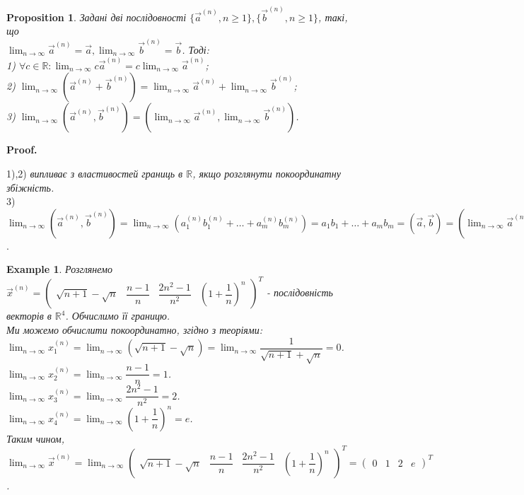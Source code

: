 \documentclass[a4paper, 10pt]{article}
\makeatletter
\def\huge{\displaystyle}
\def\qed{$\blacksquare$}
\theoremstyle{theoremdd}
\theoremstyle{theoremdd}
\theoremstyle{theoremdd}
\theoremstyle{theoremdd}
\theoremstyle{theoremdd}
\newtheorem{example}[theorem]{Example}
\theoremstyle{theoremdd}
\newtheorem{proposition}[theorem]{Proposition}
\theoremstyle{theoremdd}
\theoremstyle{theoremdd}
\theoremstyle{theoremdd}
\renewenvironment{proof}[1][Proof.\\]{\par
\pushQED{\hfill \qed}%
\normalfont \topsep6\p@\@plus6\p@\relax
\trivlist
\item\relax
{\bfseries
#1\@addpunct{.}}\hspace\labelsep\ignorespaces
}{%
\popQED\endtrivlist\@endpefalse
}
\makeatother
\begin{document}
\begin{proposition}
Задані дві послідовності $\{\vec{a}^{(n)}, n \geq 1\}, \{\vec{b}^{(n)}, n \geq 1\}$, такі, що \\ $\huge \lim_{n \to \infty} \vec{a}^{(n)} = \vec{a}, \lim_{n \to \infty} \vec{b}^{(n)} = \vec{b}$. Тоді:\\
1) $\forall c \in \mathbb{R}: \huge \lim_{n \to \infty} c \vec{a}^{(n)} = c \lim_{n \to \infty} \vec{a}^{(n)}$;\\
2) $\huge \lim_{n \to \infty} (\vec{a}^{(n)} + \vec{b}^{(n)}) = \lim_{n \to \infty} \vec{a}^{(n)} + \lim_{n \to \infty} \vec{b}^{(n)}$;\\
3) $\huge \lim_{n \to \infty} (\vec{a}^{(n)}, \vec{b}^{(n)}) = \left(\lim_{n \to \infty} \vec{a}^{(n)}, \lim_{n \to \infty} \vec{b}^{(n)}\right)$.
\end{proposition}
\begin{proof}
1),2) \textit{випливає з властивостей границь в $\mathbb{R}$, якщо розглянути покоординатну збіжність.}
\bigskip \\
3) $\huge \lim_{n \to \infty} (\vec{a}^{(n)}, \vec{b}^{(n)}) = \lim_{n \to \infty} (a_1^{(n)}b_1^{(n)} + \dots + a_m^{(n)}b_m^{(n)}) = a_1b_1 + \dots + a_m b_m = (\vec{a}, \vec{b}) = \left(\lim_{n \to \infty} \vec{a}^{(n)}, \lim_{n \to \infty} \vec{b}^{(n)}\right)$.
\end{proof}

\begin{example}
Розглянемо $\vec{x}^{(n)} = \begin{pmatrix}
\sqrt{n+1}-\sqrt{n} & \dfrac{n-1}{n} & \dfrac{2n^2-1}{n^2} & \left( 1 + \dfrac{1}{n} \right)^n
\end{pmatrix}^T$ - послідовність векторів в $\mathbb{R}^4$. Обчислимо її границю.\\
Ми можемо обчислити покоординатно, згідно з теоріями:\\
$\huge\lim_{n \to \infty} x_1^{(n)} = \lim_{n \to \infty} (\sqrt{n+1}-\sqrt{n}) = \lim_{n \to \infty} \dfrac{1}{\sqrt{n+1}+\sqrt{n}} = 0$.\\
$\huge\lim_{n \to \infty} x_2^{(n)} = \lim_{n \to \infty} \dfrac{n-1}{n} = 1$.\\
$\huge\lim_{n \to \infty} x_3^{(n)} = \lim_{n \to \infty} \dfrac{2n^2-1}{n^2} = 2$.\\
$\huge\lim_{n \to \infty} x_4^{(n)} = \lim_{n \to \infty} \left( 1 + \dfrac{1}{n}\right)^n = e$.\\
Таким чином, $\huge\lim_{n \to \infty} \vec{x}^{(n)} = \lim_{n \to \infty} \begin{pmatrix}
\sqrt{n+1}-\sqrt{n} & \dfrac{n-1}{n} & \dfrac{2n^2-1}{n^2} & \left( 1 + \dfrac{1}{n} \right)^n
\end{pmatrix}^T = \begin{pmatrix}
0 & 1 & 2 & e
\end{pmatrix}^T$.
\end{example}
\end{document}
